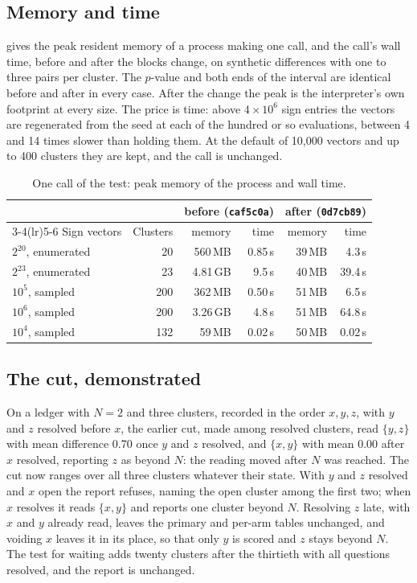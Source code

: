 \documentclass[11pt]{article}
\theoremstyle{plain}
\theoremstyle{definition}
\theoremstyle{remark}
\begin{document}
\subsection{Memory and time}
 gives the peak resident memory of a process making one call, and the call's wall
time, before and after the blocks change, on synthetic differences with one to three pairs per
cluster. The $p$-value and both ends of the interval are identical before and after in every case.
After the change the peak is the interpreter's own footprint at every size. The price is time:
above $4 \times 10^6$ sign entries the vectors are regenerated from the seed at each of the hundred
or so evaluations, between 4 and 14 times slower than holding them. At the default of 10{,}000
vectors and up to 400 clusters they are kept, and the call is unchanged.

\begin{table}[ht]
\centering\small
\caption{One call of the test: peak memory of the process and wall time.}\label{tab:memory}
\begin{tabular}{@{}lrrrrr@{}}
\toprule
& & \multicolumn{2}{c}{before (\texttt{caf5c0a})} & \multicolumn{2}{c}{after (\texttt{0d7cb89})}
\\
\cmidrule(lr){3-4}\cmidrule(lr){5-6}
Sign vectors & Clusters & memory & time & memory & time \\
\midrule
$2^{20}$, enumerated & 20 & 560\,MB & 0.85\,s & 39\,MB & 4.3\,s \\
$2^{23}$, enumerated & 23 & 4.81\,GB & 9.5\,s & 40\,MB & 39.4\,s \\
$10^5$, sampled & 200 & 362\,MB & 0.50\,s & 51\,MB & 6.5\,s \\
$10^6$, sampled & 200 & 3.26\,GB & 4.8\,s & 51\,MB & 64.8\,s \\
$10^4$, sampled & 132 & 59\,MB & 0.02\,s & 50\,MB & 0.02\,s \\
\bottomrule
\end{tabular}
\end{table}

\subsection{The cut, demonstrated}\label{sec:cutdemo}
On a ledger with $N = 2$ and three clusters, recorded in the order $x, y, z$, with $y$ and $z$
resolved before $x$, the earlier cut, made among resolved clusters, read $\{y, z\}$ with mean
difference 0.70 once $y$ and $z$ resolved, and $\{x, y\}$ with mean 0.00 after $x$ resolved,
reporting $z$ as beyond $N$: the reading moved after $N$ was reached. The cut now ranges over all
three clusters whatever their state. With $y$ and $z$ resolved and $x$ open the report refuses,
naming the open cluster among the first two; when $x$ resolves it reads $\{x, y\}$ and reports one
cluster beyond $N$. Resolving $z$ late, with $x$ and $y$ already read, leaves the primary and
per-arm tables unchanged, and voiding $x$ leaves it in its place, so that only $y$ is scored and
$z$ stays beyond $N$. The test for waiting adds twenty clusters after the thirtieth with all
questions resolved, and the report is unchanged.
\end{document}
